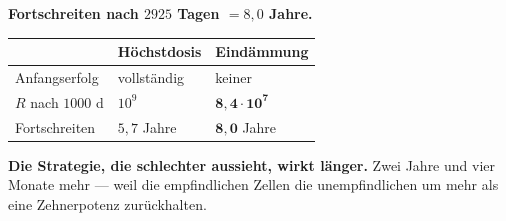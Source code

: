 \begin{merksatz}
\textbf{Fortschreiten nach $2925$ Tagen $= 8{,}0$ Jahre.}

\begin{center}
\renewcommand{\arraystretch}{1.5}
\begin{tabular}{@{}P{2.8cm}P{2.2cm}P{2.4cm}@{}}
\toprule
& \textbf{Höchstdosis} & \textbf{Eindämmung}\\
\midrule
Anfangserfolg & \textcolor{gruen}{vollständig} & \textcolor{mittel}{keiner}\\
$R$ nach $1000$ d & $10^{9}$ & $\mathbf{8{,}4\cdot10^{7}}$\\
Fortschreiten & $5{,}7$ Jahre & $\mathbf{8{,}0}$ Jahre\\
\bottomrule
\end{tabular}
\end{center}

\begin{center}
\begin{minipage}{0.9\textwidth}
\textbf{Die Strategie, die schlechter aussieht, wirkt länger.} Zwei Jahre und vier Monate mehr --- weil die empfindlichen Zellen die unempfindlichen um mehr als eine Zehnerpotenz zurückhalten.
\end{minipage}
\end{center}
\end{merksatz}


